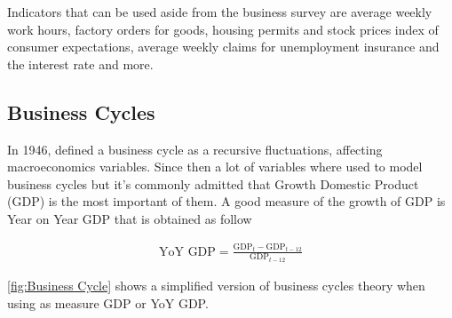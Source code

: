 \documentclass[12pt,a4paper,oneside]{book}
\begin{document}
Indicators that can be used aside from the business survey are average weekly work hours, factory orders for goods, housing permits and stock prices index of consumer expectations, average weekly claims for unemployment insurance and the interest rate and more.


\subsection{Business Cycles}
\label{sec:Business Cycles}

In 1946, \citeauthor{mitchell_measuring_1946} defined a business cycle as a recursive fluctuations, affecting macroeconomics variables. Since then a lot of variables where used to model business cycles but it's commonly admitted that Growth Domestic Product (GDP) is the most important of them. 
A good measure of the growth of GDP is Year on Year GDP that is obtained as follow

\begin{eqnarray}
   \mbox{YoY GDP} = \frac{\mbox{GDP}_t - \mbox{GDP}_{t-12}}{\mbox{GDP}_{t-12}} 
\end{eqnarray}


\autoref{fig:Business Cycle} shows a simplified version of business cycles theory when using as measure GDP or YoY GDP.
\end{document}
